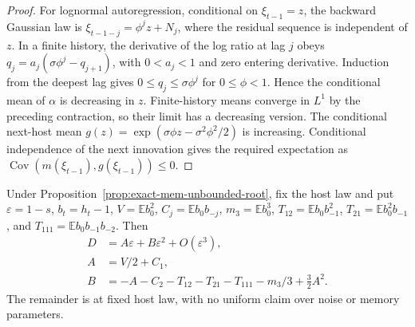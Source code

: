 \begin{proof}
For lognormal autoregression, conditional on $\xi_{t-1}=z$, the
backward Gaussian law is $\xi_{t-1-j}=\phi^jz+N_j$, where the
residual sequence is independent of $z$. In a finite history, the
derivative of the log ratio at lag $j$ obeys
$q_j=a_j(\sigma\phi^j-q_{j+1})$, with $0<a_j<1$ and zero entering
derivative. Induction from the deepest lag gives
$0\leq q_j\leq\sigma\phi^j$ for $0\leq\phi<1$.
Hence the conditional mean of $\alpha$ is decreasing in $z$.
Finite-history means converge in $L^1$ by the preceding contraction,
so their limit has a decreasing version. The conditional next-host
mean $g(z)=\exp(\sigma\phi z-\sigma^2\phi^2/2)$ is increasing.
Conditional independence of the next innovation gives the required
expectation as $\operatorname{Cov}(m(\xi_{t-1}),g(\xi_{t-1}))\leq0$.
\end{proof}

\begin{proposition}
\label{prop:exact-mem-unbounded-long}
Under Proposition~\ref{prop:exact-mem-unbounded-root}, fix the host
law and put $\varepsilon=1-s$, $b_t=h_t-1$,
$V=\mathbb E b_0^2$, $C_j=\mathbb E b_0b_{-j}$,
$m_3=\mathbb E b_0^3$, $T_{12}=\mathbb E b_0b_{-1}^2$,
$T_{21}=\mathbb E b_0^2b_{-1}$, and
$T_{111}=\mathbb E b_0b_{-1}b_{-2}$. Then
\begin{equation}
\begin{split}
 D&=A\varepsilon+B\varepsilon^2+O(\varepsilon^3),\\
 A&=V/2+C_1,\\
 B&=-A-C_2-T_{12}-T_{21}-T_{111}-m_3/3+\tfrac32A^2.
\end{split}
 \label{eq:exact-mem-unbounded-long}
\end{equation}
The remainder is at fixed host law, with no uniform claim over noise
or memory parameters.
\end{proposition}

